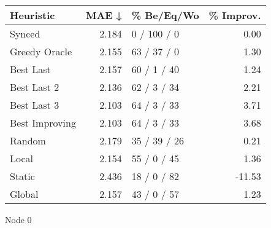 \begin{tabular}{lrlr}
\toprule
\textbf{Heuristic} & \textbf{MAE ↓} & \textbf{\% Be/Eq/Wo} & \textbf{\% Improv.} \\
\midrule
            Synced &          2.184 &          0 / 100 / 0 &                0.00 \\
     Greedy Oracle &          2.155 &          63 / 37 / 0 &                1.30 \\
         Best Last &          2.157 &          60 / 1 / 40 &                1.24 \\
       Best Last 2 &          2.136 &          62 / 3 / 34 &                2.21 \\
       Best Last 3 &          2.103 &          64 / 3 / 33 &                3.71 \\
    Best Improving &          2.103 &          64 / 3 / 33 &                3.68 \\
            Random &          2.179 &         35 / 39 / 26 &                0.21 \\
             Local &          2.154 &          55 / 0 / 45 &                1.36 \\
            Static &          2.436 &          18 / 0 / 82 &              -11.53 \\
            Global &          2.157 &          43 / 0 / 57 &                1.23 \\
\bottomrule
\end{tabular}
\caption{Node 0}
\label{tab:ds_iid_lr01_le2_bs4_0}

